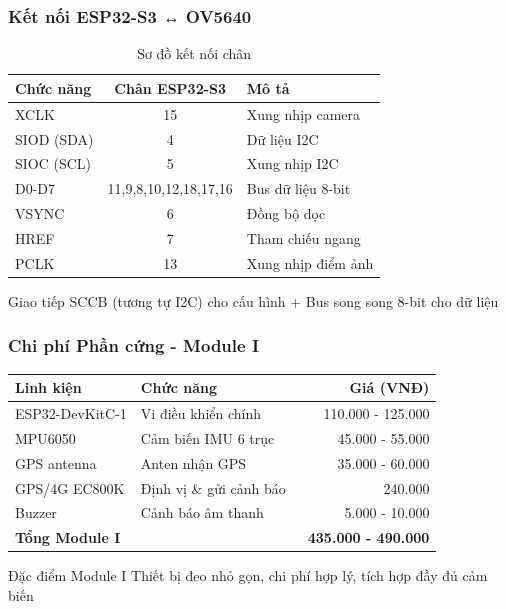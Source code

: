 \begin{frame}
\frametitle{Kết nối ESP32-S3 ↔ OV5640}

\begin{table}[h]
\centering
\caption{Sơ đồ kết nối chân}
\begin{tabular}{|l|c|l|}
\hline
\textbf{Chức năng} & \textbf{Chân ESP32-S3} & \textbf{Mô tả} \\
\hline
XCLK & 15 & Xung nhịp camera \\
SIOD (SDA) & 4 & Dữ liệu I2C \\
SIOC (SCL) & 5 & Xung nhịp I2C \\
D0-D7 & 11,9,8,10,12,18,17,16 & Bus dữ liệu 8-bit \\
VSYNC & 6 & Đồng bộ dọc \\
HREF & 7 & Tham chiếu ngang \\
PCLK & 13 & Xung nhịp điểm ảnh \\
\hline
\end{tabular}
\end{table}

\begin{alertblock}{Giao tiếp}
SCCB (tương tự I2C) cho cấu hình + Bus song song 8-bit cho dữ liệu
\end{alertblock}

\end{frame}

\begin{frame}
\frametitle{Chi phí Phần cứng - Module I}

\begin{table}[h]
\centering
\small
\begin{tabular}{|l|l|r|}
\hline
\textbf{Linh kiện} & \textbf{Chức năng} & \textbf{Giá (VNĐ)} \\
\hline
ESP32-DevKitC-1 & Vi điều khiển chính & 110.000 - 125.000 \\
MPU6050 & Cảm biến IMU 6 trục & 45.000 - 55.000 \\
GPS antenna & Anten nhận GPS & 35.000 - 60.000 \\
GPS/4G EC800K & Định vị \& gửi cảnh báo & ~240.000 \\
Buzzer & Cảnh báo âm thanh & 5.000 - 10.000 \\
\hline
\textbf{Tổng Module I} & & \textbf{~435.000 - 490.000} \\
\hline
\end{tabular}
\end{table}

\begin{block}{Đặc điểm Module I}
Thiết bị đeo nhỏ gọn, chi phí hợp lý, tích hợp đầy đủ cảm biến
\end{block}

\end{frame}

